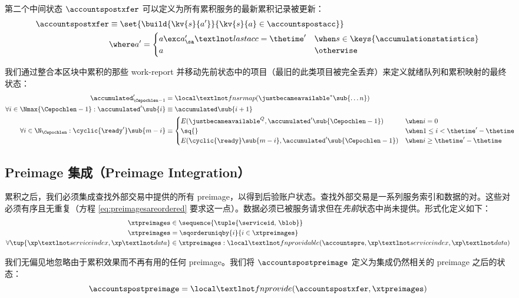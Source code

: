 第二个中间状态 $\accountspostxfer$ 可以定义为所有累积服务的最新累积记录被更新：
\begin{align}
  \accountspostxfer &\equiv \set{ \build{ \kv{s}{a'} }{ \kv{s}{a} \in \accountspostacc }} \\
  &\where a' = \begin{cases}
    a \exc a'_\sa¬lastacc = \thetime' &\when s \in \keys{\accumulationstatistics} \\
    a &\otherwise
  \end{cases}
\end{align}

我们通过整合本区块中累积的那些 work-report 并移动先前状态中的项目（最旧的此类项目被完全丢弃）来定义就绪队列和累积映射的最终状态：
\begin{align}
  \accumulated'_{\Cepochlen - 1} &= \local¬fnsrmap(\justbecameavailable^*\sub{\dots n}) \\
  \forall i \in \Nmax{\Cepochlen - 1}: \accumulated'\sub{i} &\equiv \accumulated\sub{i + 1} \\
  \forall i \in \N_\Cepochlen : \cyclic{\ready'}\sub{m - i} &\equiv \begin{cases}
    E(\justbecameavailable^Q, \accumulated'\sub{\Cepochlen - 1}) &\when i = 0 \\
    \sq{} &\when 1 \le i < \thetime' - \thetime \\
    E(\cyclic{\ready}\sub{m - i}, \accumulated'\sub{\Cepochlen - 1}) &\when i \ge \thetime' - \thetime
  \end{cases}
  \!\!\!\!
\end{align}




\subsection{Preimage 集成（Preimage Integration）}

累积之后，我们必须集成查找外部交易中提供的所有 preimage，以得到后验账户状态。查找外部交易是一系列服务索引和数据的对。这些对必须有序且无重复（方程 \ref{eq:preimagesareordered} 要求这一点）。数据必须已被服务请求但在\emph{先前}状态中尚未提供。形式化定义如下：
\begin{align}
  \xtpreimages &\in \sequence{\tuple{ \serviceid,\, \blob }} \\
  \label{eq:preimagesareordered}\xtpreimages &= \sqorderuniqby{i}{i \in \xtpreimages} \\
  \forall \tup{\xp¬serviceindex, \xp¬data} &\in \xtpreimages : \local¬fnprovidable(\accountspre, \xp¬serviceindex, \xp¬data)
\end{align}

我们无偏见地忽略由于累积效果而不再有用的任何 preimage。我们将 $\accountspostpreimage$ 定义为集成仍然相关的 preimage 之后的状态：
\begin{equation}
  \accountspostpreimage = \local¬fnprovide(\accountspostxfer, \xtpreimages)
\end{equation}
